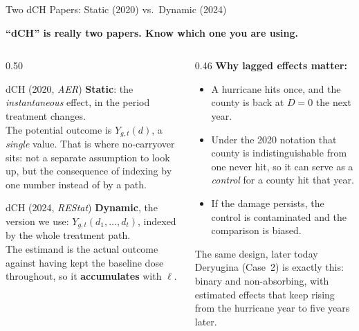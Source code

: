 \documentclass[main.tex]{subfiles}
\begin{document}
\begin{frame}{Two dCH Papers: Static (2020) vs.\ Dynamic (2024)}

  \textbf{``dCH'' is really two papers. Know which one you are using.}

  \medskip
  \begin{columns}[T]
    \begin{column}{0.50\textwidth}
      \begin{block}{dCH (2020, \textit{AER})}
        \footnotesize
        \textbf{Static}: the \emph{instantaneous} effect, in the period
        treatment changes.\\[3pt]
        The potential outcome is $Y_{g,t}(d)$, a \emph{single} value. That is
        where \alert{no-carryover} sits: not a separate assumption to look up,
        but the consequence of indexing by one number instead of by a path.
      \end{block}

      \smallskip
      \begin{block}{dCH (2024, \textit{REStat})}
        \footnotesize
        \textbf{Dynamic}, the version we use: $Y_{g,t}(d_1,\dots,d_t)$, indexed
        by the whole treatment path.\\[3pt]
        The estimand is the actual outcome against having kept the baseline
        dose throughout, so it \textbf{accumulates} with $\ell$.
      \end{block}
    \end{column}
    \begin{column}{0.46\textwidth}
      \textbf{Why lagged effects matter:}
      \begin{itemize}\footnotesize
        \item A hurricane hits once, and the county is back at $D=0$ the next
          year.
        \item Under the 2020 notation that county is indistinguishable from one
          never hit, so it can serve as a \emph{control} for a county hit that
          year.
        \item If the damage persists, the control is contaminated and the
          comparison is biased.
      \end{itemize}

      \smallskip
      \begin{exampleblock}{\footnotesize The same design, later today}
        \footnotesize
        Deryugina (Case~2) is exactly this: binary and non-absorbing, with
        estimated effects that keep rising from the hurricane year to five
        years later.
      \end{exampleblock}
    \end{column}
  \end{columns}

\end{frame}
\end{document}
